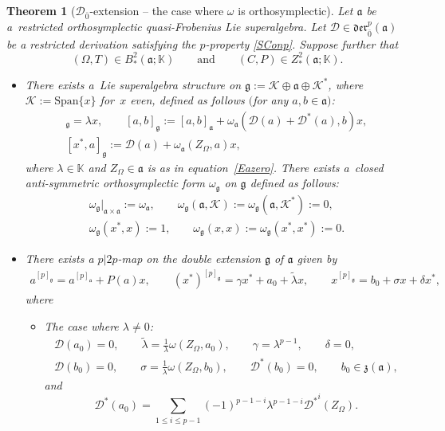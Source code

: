 \documentclass[pdftex]{sigma}
\numberwithin{equation}{section}
\newtheorem{Theorem}{Theorem}[section]
\begin{document}
\begin{Theorem}[${\mathscr D}_{\bar 0}$-extension -- the case where $\omega$ is orthosymplectic]\label{MainTh} Let $\mathfrak{a}$ be a~restricted orthosymplectic quasi-Frobenius Lie superalgebra. Let ${\mathscr D}\in \mathfrak{der}_{\bar 0}^p(\mathfrak{a})$ be a restricted derivation satisfying the $p$-property \eqref{SConp}. Suppose further that
\[
(\Omega,T) \in B^2_*(\mathfrak{a}; \mathbb{K}) \qquad \text{and} \qquad (C, P)\in Z^2_*(\mathfrak{a}; \mathbb{K}).
\]
\begin{itemize}\itemsep=0pt
\item[$(i)$] There exists a~Lie superalgebra structure on $\mathfrak{g}:=\mathscr{K} \oplus \mathfrak{a} \oplus \mathscr{K} ^*$, where $\mathscr{K} :=\mathrm{Span}\{x\}$ for~$x$ even, defined as follows $($for any $a, b\in \mathfrak{a})$:
\begin{gather*}
[x ,x^*]_\mathfrak{g}=\lambda x, \qquad [a,b]_\mathfrak{g} := [a,b]_\mathfrak{a} + \omega_\mathfrak{a}( {\mathscr D}(a)+{\mathscr D}^*(a), b)x, \\
 [x^*,a]_\mathfrak{g} := {\mathscr D}(a)+ \omega_\mathfrak{a}(Z_\Omega,a)x,
\end{gather*}
where $\lambda\in \mathbb{K}$ and $Z_\Omega\in \mathfrak{a}$ is as in equation~\eqref{Eazero}. There exists a~closed anti-symmetric orthosymplectic form $\omega_\mathfrak{g}$ on $\mathfrak{g}$ defined as follows:
\begin{gather*}
{\omega_\mathfrak{g}}\vert_{\mathfrak{a} \times \mathfrak{a}}:= \omega_\mathfrak{a}, \qquad \omega_\mathfrak{g}(\mathfrak{a},\mathscr{K} ):=\omega_\mathfrak{g}(\mathfrak{a},\mathscr{K} ^*):=0, \\ \omega_\mathfrak{g}(x^*,x):=1, \qquad
\omega_\mathfrak{g}(x,x):=\omega_\mathfrak{g}(x^*,x^*) :=0.
\end{gather*}
\item[$(ii)$] There exists a $p|2p$-map on the double extension $\mathfrak{g}$ of $\mathfrak{a}$ given by
\begin{gather*}
a^{[p]_\mathfrak{g}} = a^{[p]_\mathfrak{a}} +P(a) x,\qquad
(x^*)^{[p]_\mathfrak{g}} = \gamma x^*+ a_0 + \tilde \lambda x,\qquad
x^{[p]_\mathfrak{g}} = b_0+ \sigma x +\delta x^*,
\end{gather*}
where
\begin{itemize}\itemsep=0pt
\item[$(a)$] The case where $\lambda\not =0$:
\begin{gather*}
 {\mathscr D}(a_0) = 0, \qquad \tilde \lambda = \frac{1}{\lambda} \omega(Z_\Omega, a_0), \qquad\gamma = \lambda^{p-1}, \qquad \delta=0, \\
 {\mathscr D}(b_0) = 0, \qquad \sigma = \frac{1}{\lambda} \omega(Z_\Omega, b_0), \qquad{\mathscr D}^*(b_0) = 0, \qquad b_0\in {\mathfrak z}(\mathfrak{a}),
\end{gather*}
and
\begin{equation}
\label{eqst1}
{\mathscr D}^*(a_0)=\sum_{1\leq i \leq p-1} (-1)^{p-1-i} \lambda^{p-1-i} {{\mathscr D}^*}^i(Z_\Omega).
\end{equation}


\end{itemize}
\end{itemize}
\end{Theorem}
\end{document}
